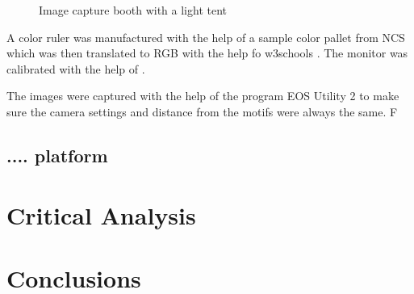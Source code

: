 \documentclass[12 pt]{paper}
\begin{document}
\begin{figure}[!htb]
	\centering
	\caption[short:]{Image capture booth with a light tent}
	\label{---}
\end{figure}

A color ruler was manufactured with the help of a sample color pallet from NCS which was then translated to RGB with the help fo w3schools \autocite[]{w3}. The monitor was calibrated with the help of \textcite[]{koch2007}. 


 The images were captured with the help of the program EOS Utility 2 to make sure the camera settings and distance from the motifs were always the same. 
F
\subsection{.... platform}%

\section {Critical Analysis}


\section{Conclusions}


\newpage

%
%
\printbibliography
\end{document}
